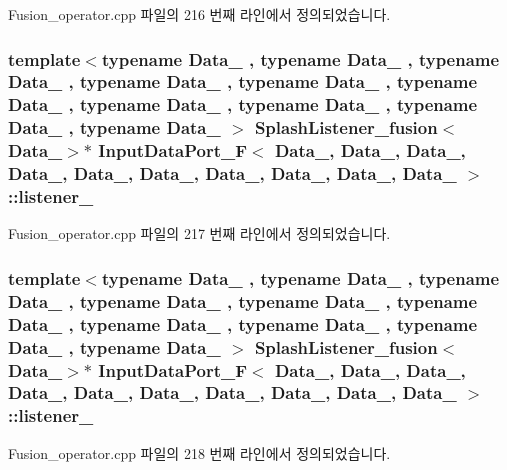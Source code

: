Fusion\+\_\+operator.\+cpp 파일의 216 번째 라인에서 정의되었습니다.

\subsubsection[{\texorpdfstring{listener\+\_\+6}{listener_6}}]{\setlength{\rightskip}{0pt plus 5cm}template$<$typename Data\+\_ , typename Data\+\_ , typename Data\+\_ , typename Data\+\_ , typename Data\+\_ , typename Data\+\_ , typename Data\+\_ , typename Data\+\_ , typename Data\+\_ , typename Data\+\_ $>$ {\bf Splash\+Listener\+\_\+fusion}$<$Data\+\_$>$$\ast$ {\bf Input\+Data\+Port\+\_\+F}$<$ Data\+\_, Data\+\_, Data\+\_, Data\+\_, Data\+\_, Data\+\_, Data\+\_, Data\+\_, Data\+\_, Data\+\_ $>$\+::listener\+\_}\hypertarget{classInputDataPort__F_a99b57cc9e7aadd5bef83a3dc96eb7680}{}\label{classInputDataPort__F_a99b57cc9e7aadd5bef83a3dc96eb7680}


Fusion\+\_\+operator.\+cpp 파일의 217 번째 라인에서 정의되었습니다.

\subsubsection[{\texorpdfstring{listener\+\_\+7}{listener_7}}]{\setlength{\rightskip}{0pt plus 5cm}template$<$typename Data\+\_ , typename Data\+\_ , typename Data\+\_ , typename Data\+\_ , typename Data\+\_ , typename Data\+\_ , typename Data\+\_ , typename Data\+\_ , typename Data\+\_ , typename Data\+\_ $>$ {\bf Splash\+Listener\+\_\+fusion}$<$Data\+\_$>$$\ast$ {\bf Input\+Data\+Port\+\_\+F}$<$ Data\+\_, Data\+\_, Data\+\_, Data\+\_, Data\+\_, Data\+\_, Data\+\_, Data\+\_, Data\+\_, Data\+\_ $>$\+::listener\+\_}\hypertarget{classInputDataPort__F_af2b7e4cfb20ef4fb3e945e32d8792fd2}{}\label{classInputDataPort__F_af2b7e4cfb20ef4fb3e945e32d8792fd2}


Fusion\+\_\+operator.\+cpp 파일의 218 번째 라인에서 정의되었습니다.

